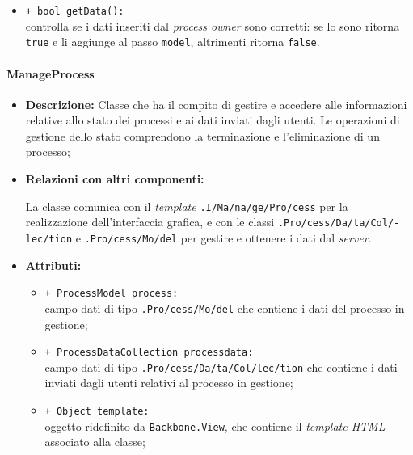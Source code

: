 \begin{flushleft}
\begin{itemize}
\begin{sloppypar}
\begin{itemize}
\item \texttt{+ bool getData():}\\ controlla se i dati inseriti dal \textit{process owner} sono corretti: se lo sono ritorna \texttt{true} e li aggiunge al passo \texttt{model}, altrimenti ritorna \texttt{false}.
\end{itemize}
\end{sloppypar}
\end{itemize}
\end{flushleft}

\paragraph{ManageProcess}
\label{manageProcess}
\begin{flushleft}
\begin{itemize}
\item \textbf{Descrizione:} Classe che ha il compito di gestire e accedere alle informazioni relative allo stato dei processi e ai dati inviati dagli utenti. Le operazioni di gestione dello stato comprendono la terminazione e l'eliminazione di un processo;
\item \textbf{Relazioni con altri componenti:}
\begin{sloppypar}
La classe comunica con il \textit{template} \texttt{\viewAdmin{}.I\fshyp{}Ma\fshyp{}na\fshyp{}ge\fshyp{}Pro\fshyp{}cess} per la realizzazione dell'interfaccia grafica, e con le classi \texttt{\collection{}.Pro\fshyp{}cess\fshyp{}Da\fshyp{}ta\fshyp{}Col\fshyp{}lec\fshyp{}tion} e \texttt{\model{}.Pro\fshyp{}cess\fshyp{}Mo\fshyp{}del} per gestire e ottenere i dati dal \textit{server}.
\end{sloppypar}
\item \textbf{Attributi:}
\begin{sloppypar}
\begin{itemize}
\item \texttt{+ ProcessModel process:}\\ campo dati di tipo \texttt{\model{}.Pro\fshyp{}cess\fshyp{}Mo\fshyp{}del} che contiene i dati del processo in gestione;
\item \texttt{+ ProcessDataCollection processdata:}\\ campo dati di tipo \texttt{\collection{}.Pro\fshyp{}cess\fshyp{}Da\fshyp{}ta\fshyp{}Col\fshyp{}lec\fshyp{}tion} che contiene i dati inviati dagli utenti relativi al processo in gestione;
\item \texttt{+ Object template:}\\ oggetto ridefinito da \texttt{Backbone.View}, che contiene il \textit{template HTML} associato alla classe;

\end{itemize}
\end{sloppypar}
\end{itemize}
\end{flushleft}
